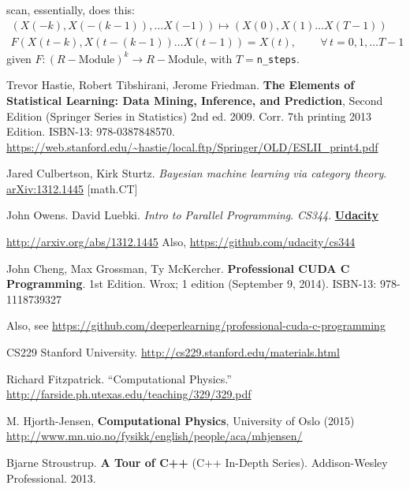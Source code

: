 \documentclass[10pt]{amsart}
\begin{document}
\begin{multicols*}{2}
scan, essentially, does this:
\begin{equation}
\begin{gathered}
  (X(-k),X(-(k-1)),\dots X(-1)) \mapsto (X(0),X(1)\dots X(T-1)) \\ 
F(X(t-k), X(t-(k-1))\dots X(t-1)) = X(t), \qquad \, \forall \, t=0,1,\dots T-1
  \end{gathered}
\end{equation}
given $F:(R-\text{Module})^k \to R-\text{Module}$, with $T=$\verb|n_steps|.  




\end{multicols*}
\begin{thebibliography}{9}
Trevor Hastie, Robert Tibshirani, Jerome Friedman.   \textbf{The Elements of Statistical Learning: Data Mining, Inference, and Prediction}, Second Edition (Springer Series in Statistics) 2nd ed. 2009. Corr. 7th printing 2013 Edition.  ISBN-13: 978-0387848570.  \url{https://web.stanford.edu/~hastie/local.ftp/Springer/OLD/ESLII_print4.pdf}

Jared Culbertson, Kirk Sturtz.  \emph{Bayesian machine learning via category theory}.  \href{http://arxiv.org/abs/1312.1445}{arXiv:1312.1445} [math.CT]

John Owens.  David Luebki.  \emph{Intro to Parallel Programming}.  \emph{CS344}.  \textbf{\href{https://www.udacity.com/}{Udacity}}  
  
\url{http://arxiv.org/abs/1312.1445} Also, \url{https://github.com/udacity/cs344}  

John Cheng, Max Grossman, Ty McKercher.  \textbf{Professional CUDA C Programming}.  1st Edition.  Wrox; 1 edition (September 9, 2014).  ISBN-13: 978-1118739327

Also, see \url{https://github.com/deeperlearning/professional-cuda-c-programming}

CS229 Stanford University.  \url{http://cs229.stanford.edu/materials.html}


Richard Fitzpatrick.  ``Computational Physics.''  \url{http://farside.ph.utexas.edu/teaching/329/329.pdf}

 M. Hjorth-Jensen, \textbf{Computational Physics}, University of Oslo (2015) \url{http://www.mn.uio.no/fysikk/english/people/aca/mhjensen/}

 Bjarne Stroustrup.  \textbf{A Tour of C++} (C++ In-Depth Series). Addison-Wesley Professional.   2013. 
 

\end{thebibliography}
\end{document}
